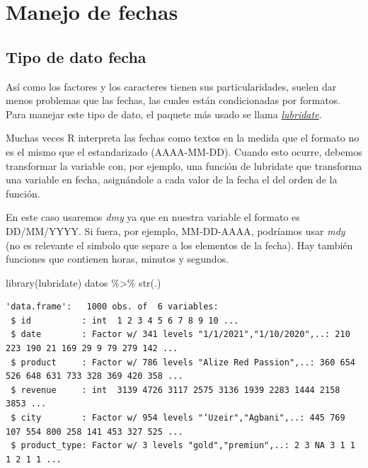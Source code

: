 \documentclass[
  letterpaper,
  DIV=11,
  numbers=noendperiod]{scrreprt}
\newenvironment{Shaded}{\begin{snugshade}}{\end{snugshade}}
\newcommand{\FunctionTok}[1]{\textcolor[rgb]{0.28,0.35,0.67}{#1}}
\newcommand{\NormalTok}[1]{\textcolor[rgb]{0.00,0.23,0.31}{#1}}
\newcommand{\SpecialCharTok}[1]{\textcolor[rgb]{0.37,0.37,0.37}{#1}}
\begin{document}
\hypertarget{manejo-de-fechas}{%
\section{Manejo de fechas}\label{manejo-de-fechas}}

\hypertarget{tipo-de-dato-fecha}{%
\subsection{Tipo de dato fecha}\label{tipo-de-dato-fecha}}

Así como los factores y los caracteres tienen sus particularidades,
suelen dar menos problemas que las fechas, las cuales están
condicionadas por formatos. Para manejar este tipo de dato, el paquete
más usado se llama
\href{https://www.rdocumentation.org/packages/lubridate/versions/1.8.0}{\emph{lubridate}}\emph{.}

Muchas veces R interpreta las fechas como textos en la medida que el
formato no es el mismo que el estandarizado (AAAA-MM-DD). Cuando esto
ocurre, debemos transformar la variable con, por ejemplo, una función de
lubridate que transforma una variable en fecha, asignándole a cada valor
de la fecha el del orden de la función.

En este caso usaremos \emph{dmy} ya que en nuestra variable el formato
es DD/MM/YYYY. Si fuera, por ejemplo, MM-DD-AAAA, podríamos usar
\emph{mdy} (no es relevante el simbolo que separe a los elementos de la
fecha). Hay también funciones que contienen horas, minutos y segundos.

\begin{Shaded}
\begin{Highlighting}[]
\FunctionTok{library}\NormalTok{(lubridate)}
\NormalTok{datos }\SpecialCharTok{\%\textgreater{}\%} \FunctionTok{str}\NormalTok{(.)}
\end{Highlighting}
\end{Shaded}

\begin{verbatim}
'data.frame':   1000 obs. of  6 variables:
 $ id          : int  1 2 3 4 5 6 7 8 9 10 ...
 $ date        : Factor w/ 341 levels "1/1/2021","1/10/2020",..: 210 223 190 21 169 29 9 79 279 142 ...
 $ product     : Factor w/ 786 levels "Alize Red Passion",..: 360 654 526 648 631 733 328 369 420 358 ...
 $ revenue     : int  3139 4726 3117 2575 3136 1939 2283 1444 2158 3853 ...
 $ city        : Factor w/ 954 levels "‘Uzeir","Agbani",..: 445 769 107 554 800 258 141 453 327 525 ...
 $ product_type: Factor w/ 3 levels "gold","premiun",..: 2 3 NA 3 1 1 1 2 1 1 ...
\end{verbatim}
\end{document}
